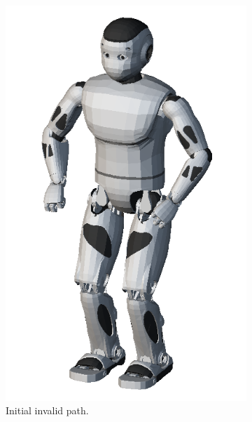 \begin{figure}
  \centering
  \begin{subfigure}{0.48\columnwidth}
    \centering
    \includegraphics[width = \columnwidth]
                    {src/chap3-optimal-motion-planning/figure/romeo-full-mesh.png}
    \caption{Initial invalid path.}
    \label{simple-pathb}
  \end{subfigure}
  \begin{subfigure}{0.48\columnwidth}
    \centering

\end{subfigure}
\end{figure}
